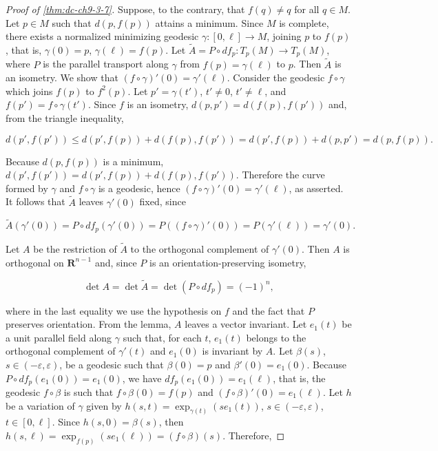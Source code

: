 \begin{proof}[Proof of \cref{thm:dc-ch9-3-7}]
  \sketch
  Suppose, to the contrary, that $f(q)\ne q$ for all $q\in M$.
  Let $p\in M$ such that $d(p,f(p))$ attains a minimum. Since $M$ is complete, there
  exists a normalized minimizing geodesic $\gamma:[0,\ell]\to M$, joining $p$ to
  $f(p)$, that is, $\gamma(0)=p$, $\gamma(\ell)=f(p)$. Let
  $\tilde A=P\circ df_p:T_p(M)\to T_p(M)$, where $P$ is the parallel transport along
  $\gamma$ from $f(p)=\gamma(\ell)$ to $p$. Then $\tilde A$ is an isometry. We show
  that $(f\circ\gamma)'(0)=\gamma'(\ell)$. Consider the geodesic $f\circ\gamma$ which
  joins $f(p)$ to $f^2(p)$. Let $p'=\gamma(t')$, $t'\ne 0$, $t'\ne\ell$, and
  $f(p')=f\circ\gamma(t')$. Since $f$ is an isometry, $d(p,p')=d(f(p),f(p'))$ and,
  from the triangle inequality,

  $$
  d(p',f(p'))\le d(p',f(p))+d(f(p),f(p'))=d(p',f(p))+d(p,p')=d(p,f(p)).
  $$

  Because $d(p,f(p))$ is a minimum, $d(p',f(p'))=d(p',f(p))+d(f(p),f(p'))$. Therefore
  the curve formed by $\gamma$ and $f\circ\gamma$ is a geodesic, hence
  $(f\circ\gamma)'(0)=\gamma'(\ell)$, as asserted. It follows that $\tilde A$ leaves
  $\gamma'(0)$ fixed, since

  $$
  \tilde A(\gamma'(0))=P\circ df_p(\gamma'(0))=P((f\circ\gamma)'(0))=P(\gamma'(\ell))=\gamma'(0).
  $$

  Let $A$ be the restriction of $\tilde A$ to the orthogonal complement of
  $\gamma'(0)$. Then $A$ is orthogonal on $\mathbf{R}^{n-1}$ and, since $P$ is an
  orientation-preserving isometry,

  $$
  \det A=\det\tilde A=\det(P\circ df_p)=(-1)^n,
  $$

  where in the last equality we use the hypothesis on $f$ and the fact that $P$
  preserves orientation. From the lemma, $A$ leaves a vector invariant. Let $e_1(t)$
  be a unit parallel field along $\gamma$ such that, for each $t$, $e_1(t)$ belongs to
  the orthogonal complement of $\gamma'(t)$ and $e_1(0)$ is invariant by $A$. Let
  $\beta(s)$, $s\in(-\varepsilon,\varepsilon)$, be a geodesic such that $\beta(0)=p$ and
  $\beta'(0)=e_1(0)$. Because $P\circ df_p(e_1(0))=e_1(0)$, we have
  $df_p(e_1(0))=e_1(\ell)$, that is, the geodesic $f\circ\beta$ is such that
  $f\circ\beta(0)=f(p)$ and $(f\circ\beta)'(0)=e_1(\ell)$. Let $h$ be a variation of
  $\gamma$ given by $h(s,t)=\exp_{\gamma(t)}(se_1(t))$,
  $s\in(-\varepsilon,\varepsilon)$, $t\in[0,\ell]$. Since $h(s,0)=\beta(s)$, then
  $h(s,\ell)=\exp_{f(p)}(se_1(\ell))=(f\circ\beta)(s)$. Therefore,


\end{proof}
